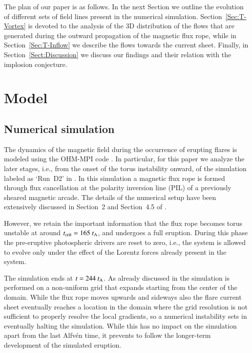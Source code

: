 \documentclass[apj]{emulateapj}
\newcommand{\tA}{t_{\rm A}}
\begin{document}
The plan of our paper is as follows. In the next Section we outline the evolution of different sets of field lines present in the numerical simulation.  Section~\ref{Sec:T-Vortex} is devoted to the analysis of the 3D distribution of the flows that are generated during the outward propagation of the magnetic flux rope, while in Section~\ref{Sec:T-Inflow} we describe the flows towards the current sheet. Finally, in Section~\ref{Sect:Discussion} we discuss our findings and their relation with the implosion conjecture. 

\section{Model}
\label{Sect:Model}


\subsection{Numerical simulation}
\label{Sec:Numerical}

The dynamics of the magnetic field during the occurrence of erupting flares is modeled using the OHM-MPI code \citep{Zuc2015}. In particular, for this paper we analyze the later stages, i.e., from the onset of the torus instability onward, of the simulation labeled as `Run~D2' in \cite{Zuc2015}. In this simulation a magnetic flux rope is formed through flux cancellation at the polarity inversion line (PIL) of a previously sheared magnetic arcade.  The details of the numerical setup have been extensively discussed in Section~2 and Section~4.5 of \cite{Zuc2015}. 

However, we  retain the important information that the flux rope becomes torus unstable at around $t_{\text{crit}}=165~\tA$, and undergoes a full eruption. During this phase the pre-eruptive photospheric drivers are reset to zero, i.e., the system is allowed to evolve only under the effect of the Lorentz forces already present in the system.

The simulation ends at $t=244~\tA$. As already discussed in \cite{Zuc2015} the simulation is performed on a non-uniform grid that expands starting from the center of the domain. While the flux rope moves upwards and sideways also the flare current sheet eventually reaches a location in the domain where the grid resolution is not sufficient to properly resolve the local gradients, so a numerical instability sets in eventually halting the simulation. While this has no impact on the simulation apart from the last Alfv\'{e}n time, it prevents to follow the longer-term development of the simulated eruption.
\end{document}
